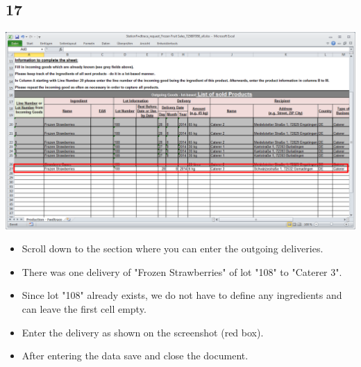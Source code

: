 \documentclass{beamer}
\begin{document}
\subsection{17}
\begin{frame}
	\begin{center}
  		\includegraphics[height=0.5\textheight]{17.png}
	\end{center}
	\begin{itemize}
		\item Scroll down to the section where you can enter the outgoing deliveries.
		\item There was one delivery of "Frozen Strawberries" of lot "108" to "Caterer 3".
		\item Since lot "108" already exists, we do not have to define any ingredients and can leave the first cell empty.
		\item Enter the delivery as shown on the screenshot (red box).
		\item After entering the data save and close the document.
	\end{itemize}
\end{frame}
\end{document}
